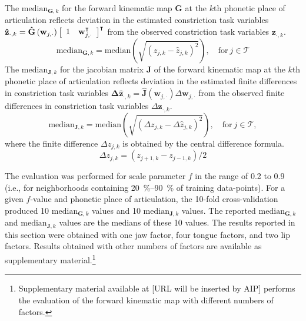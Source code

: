\documentclass[reprint]{JASAnew}\usepackage[]{graphicx}\usepackage[]{color}
\begin{document}
The $\mathrm{median}_{\mathbf{G},k}$ for the forward kinematic map $\mathbf{G}$ at the $k$th phonetic place of articulation reflects deviation in the estimated constriction task variables $\mathbf{\hat{z}}_{\cdot,k} = \mathbf{\hat{G}}\left( \mathbf{w}_{j,\cdot} \right) \left[ \begin{array}{c c} 1 & \mathbf{w}_{j,\cdot}^\intercal \end{array} \right]^\intercal$ from the observed constriction task variables $\mathbf{z}_{\cdot,k}$.
%
\begin{equation}
\mathrm{median}_{\mathbf{G},k} = \mathrm{median} \left( \sqrt{ \left( z_{j,k} - \hat{z}_{j,k} \right)^2 } \right), \quad \text{for}~j\in\mathcal{T} 
\end{equation}
The $\mathrm{median}_{\mathbf{J},k}$ for the jacobian matrix $\mathbf{J}$ of the forward kinematic map at the $k$th phonetic place of articulation reflects deviation in the estimated finite differences in constriction task variables $\mathbf{\Delta \hat{z}}_{\cdot,k} = \mathbf{\hat{J}}\left( \mathbf{w}_{j,\cdot} \right) \Delta \mathbf{w}_{j,\cdot}$ from the observed finite differences in constriction task variables $\Delta \mathbf{z}_{\cdot,k}$.
%
\begin{equation}
\mathrm{median}_{\mathbf{J},k} = \mathrm{median} \left( \sqrt{ \left( \Delta z_{j,k} - \Delta \hat{z}_{j,k} \right)^2 } \right), \quad \text{for}~j\in\mathcal{T},
\end{equation}
%
where the finite difference $\Delta z_{j,k}$ is obtained by the central difference formula.
%
\begin{equation}
\Delta z_{j,k} = \left( z_{j+1,k} - z_{j-1,k} \right) / 2
\end{equation}


The evaluation was performed for scale parameter $f$ in the range of \num{0.2} to \num{0.9} (i.e., for neighborhoods containing \SIrange{20}{90}{\percent} of training data-points).
%
For a given $f$-value and phonetic place of articulation, the 10-fold cross-validation produced \num{10} $\mathrm{median}_{\mathbf{G},k}$ values and \num{10} $\mathrm{median}_{\mathbf{J},k}$ values.
%
The reported $\mathrm{median}_{\mathbf{G},k}$ and $\mathrm{median}_{\mathbf{J},k}$ values are the medians of these \num{10} values.
%
The results reported in this section were obtained with one jaw factor, four tongue factors, and two lip factors. Results obtained with other numbers of factors are available as supplementary material.\footnote{Supplementary material available at [URL will be inserted by AIP] performs the evaluation of the forward kinematic map with different numbers of factors.}
\end{document}

